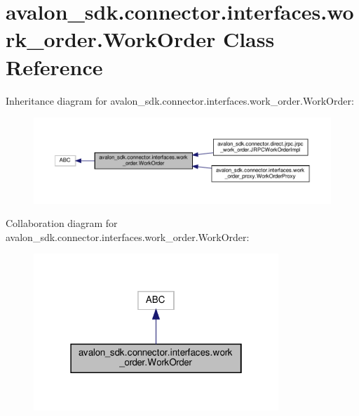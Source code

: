 \hypertarget{classavalon__sdk_1_1connector_1_1interfaces_1_1work__order_1_1WorkOrder}{}\section{avalon\+\_\+sdk.\+connector.\+interfaces.\+work\+\_\+order.\+Work\+Order Class Reference}
\label{classavalon__sdk_1_1connector_1_1interfaces_1_1work__order_1_1WorkOrder}


Inheritance diagram for avalon\+\_\+sdk.\+connector.\+interfaces.\+work\+\_\+order.\+Work\+Order\+:
\nopagebreak
\begin{figure}[H]
\begin{center}
\leavevmode
\includegraphics[width=350pt]{classavalon__sdk_1_1connector_1_1interfaces_1_1work__order_1_1WorkOrder__inherit__graph}
\end{center}
\end{figure}


Collaboration diagram for avalon\+\_\+sdk.\+connector.\+interfaces.\+work\+\_\+order.\+Work\+Order\+:
\nopagebreak
\begin{figure}[H]
\begin{center}
\leavevmode
\includegraphics[width=262pt]{classavalon__sdk_1_1connector_1_1interfaces_1_1work__order_1_1WorkOrder__coll__graph}
\end{center}
\end{figure}
